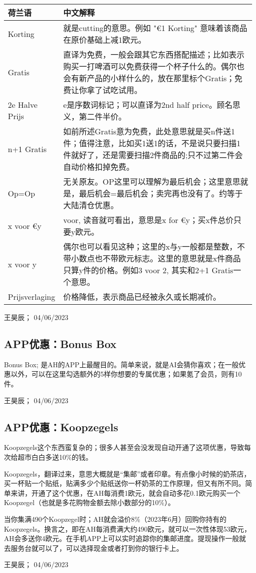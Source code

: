 \begin{flushleft}
\begin{tabular}{p{}|p{}}
\textbf{荷兰语} & \textbf{中文解释} \\ \hline
Korting & 就是cutting的意思。例如 "€1 Korting" 意味着该商品在原价基础上减1欧元。 \\ \hline
Gratis & 直译为免费，一般会跟其它东西搭配描述；比如表示购买一打啤酒可以免费获得一个杯子什么的。偶尔也会有新产品的小样什么的，放在那里标个Gratis；免费让你拿了试吃试用。 \\ \hline
2e Halve Prijs & e是序数词标记；可以直译为2nd half price。顾名思义，第二件半价。 \\ \hline
n+1 Gratis & 如前所述Gratis意为免费，此处意思就是买n件送1件；值得注意，比如买1送1的话，不是说只要扫描1件就好了，还是需要扫描2件商品的;只不过第二件会自动价格扣掉免费。 \\ \hline
Op=Op & 无关原友。OP这里可以理解为最后机会；这里意思就是，最后机会=最后机会；卖完再也没有了。约等于大陆清仓优惠。 \\ \hline
x voor €y & voor, 读音就可看出，意思是x for €y；买x件总价只要y欧元。 \\ \hline
x voor y & 偶尔也可以看见这种；这里的x与y一般都是整数，不带小数点也不带欧元标志。这里的意思就是x件商品只算y件的价格。例如3 voor 2, 其实和2+1 Gratis一个意思。 \\ \hline
Prijsverlaging & 价格降低，表示商品已经被永久或长期减价。 
\end{tabular}
\end{flushleft}
\begin{flushright}
王昊辰； 04/06/2023
\end{flushright}

\subsection{APP优惠：Bonus Box}
Bonus Box; 是AH的APP上最醒目的。简单来说，就是AI会猜你喜欢；在一般优惠以外，可以在这里勾选额外的5样你想要的专属优惠；如果氪了会员，则有10件。
\begin{flushright}
王昊辰； 04/06/2023
\end{flushright}

\subsection{APP优惠：Koopzegels}
Koopzegels这个东西蛮复杂的；很多人甚至会没发现自动开通了这项优惠，导致每次给超市白白多送10\%的钱。

Koopzegels，翻译过来，意思大概就是“集邮”或者印章。有点像小时候的奶茶店，买一杯贴一个贴纸，贴满多少个贴纸送你一杯奶茶的工作原理，但又有所不同。简单来讲，开通了这个优惠，在AH每消费1欧元，就会自动多花0.1欧元购买一个Koopzegel（也就是多花购物金额去除小数部分的10\%）。

当你集满490个Koopzegel时；AH就会溢价8\%（2023年6月）回购你持有的Koopzegels。换言之，即在AH每消费满大约490欧元，就可以一次性体现53欧元，AH会多送你4欧元。在手机APP上可以实时追踪你的集邮进度。提现操作一般就去服务台就可以了，可以选择现金或者打到你的银行卡上。
\begin{flushright}
王昊辰； 04/06/2023
\end{flushright}
\vspace{\betsubsec} %